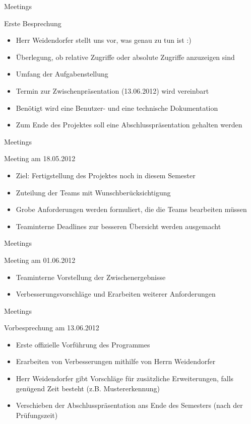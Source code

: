 \begin{frame}{Meetings}
\begin{block}{Erste Besprechung}
\begin{itemize}[<+->]
\pause\item Herr Weidendorfer stellt uns vor, was genau zu tun ist :)
\item Überlegung, ob relative Zugriffe oder absolute Zugriffe anzuzeigen sind
\item Umfang der Aufgabenstellung
\item Termin zur Zwischenpräsentation (13.06.2012) wird vereinbart
\item Benötigt wird eine Benutzer- und eine technische Dokumentation
\item Zum Ende des Projektes soll eine Abschlusspräsentation gehalten werden
\end{itemize}
\end{block}
\end{frame}

\begin{frame}{Meetings}
\begin{block}{Meeting am 18.05.2012}
\begin{itemize}[<+->]
\pause\item Ziel: Fertigstellung des Projektes noch in diesem Semester
\item Zuteilung der Teams mit Wunschberücksichtigung
\item Grobe Anforderungen werden formuliert, die die Teams bearbeiten müssen
\item Teaminterne Deadlines zur besseren Übersicht werden ausgemacht
\end{itemize}
\end{block}
\end{frame}

\begin{frame}{Meetings}
\begin{block}{Meeting am 01.06.2012}
\begin{itemize}[<+->]
\pause\item Teaminterne Vorstellung der Zwischenergebnisse
\item Verbesserungsvorschläge und Erarbeiten weiterer Anforderungen
\end{itemize}
\end{block}
\end{frame}

\begin{frame}{Meetings}
\begin{block}{Vorbesprechung am 13.06.2012}
\begin{itemize}[<+->]
\pause\item Erste offizielle Vorführung des Programmes
\item Erarbeiten von Verbesserungen mithilfe von Herrn Weidendorfer
\item Herr Weidendorfer gibt Vorschläge für zusätzliche Erweiterungen, falls genügend Zeit besteht (z.B. Mustererkennung)
\item Verschieben der Abschlusspräsentation ans Ende des Semesters (nach der Prüfungszeit)
\end{itemize}
\end{block}
\end{frame}

